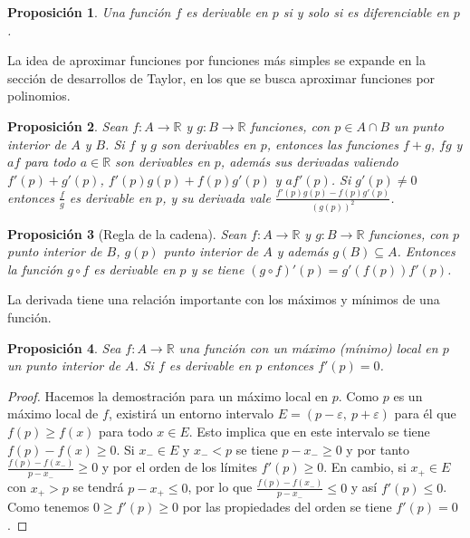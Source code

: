 \documentclass{article}
\newtheorem{prop}{Proposición}
\newcommand{\reales}{\mathbb{R}}
\begin{document}
\begin{prop}
	Una función $f$ es derivable en $p$ si y solo si es diferenciable en $p$.
\end{prop}

La idea de aproximar funciones por funciones más simples se expande en la sección de desarrollos de Taylor, en los que se busca aproximar funciones por polinomios.

\begin{prop}
	Sean $f: A \rightarrow \reales$ y $g: B \rightarrow \reales$ funciones, con $p \in A \cap B$ un punto interior de $A$ y $B$. Si $f$ y $g$ son derivables en $p$, entonces las funciones $f + g$, $fg$ y $af$ para todo $a \in \reales$ son derivables en $p$, además sus derivadas valiendo $f'(p) + g'(p)$, $f'(p)g(p) + f(p)g'(p)$ y $af'(p)$. Si $g'(p) \neq 0$ entonces $\frac{f}{g}$ es derivable en $p$, y su derivada vale $\frac{f'(p)g(p) - f(p)g'(p)}{(g(p))^2}$.
\end{prop}

\begin{prop}[Regla de la cadena]
	Sean $f: A \rightarrow \reales$ y $g: B \rightarrow \reales$ funciones, con $p$ punto interior de $B$, $g(p)$ punto interior de $A$ y además $g(B) \subseteq A$. Entonces la función $g \circ f$ es derivable en $p$ y se tiene $(g \circ f)'(p) = g'(f(p))f'(p)$.
\end{prop} 

La derivada tiene una relación importante con los máximos y mínimos de una función.

\begin{prop}
	Sea $f: A \rightarrow \reales$ una función con un máximo (mínimo) local en $p$ un punto interior de $A$. Si $f$ es derivable en $p$ entonces $f'(p) = 0$.
\end{prop}
\begin{proof}
	Hacemos la demostración para un máximo local en $p$. Como $p$ es un máximo local de $f$, existirá un entorno intervalo $E=(p-\varepsilon,\ p+\varepsilon)$ para él que $f(p) \geq f(x)$ para todo $x \in E$. Esto implica que en este intervalo se tiene $f(p) - f(x) \geq 0$. Si $x_{-} \in E$ y $x_{-} < p$ se tiene $p - x_{-} \geq 0$ y por tanto $\frac{f(p) - f(x_{-})}{p - x_{-}} \geq 0$ y por el orden de los límites $f'(p) \geq 0$. En cambio, si $x_{+} \in E$ con $x_{+} > p$ se tendrá $p - x_{+} \leq 0$, por lo que $\frac{f(p) - f(x_{-})}{p - x_{-}} \leq 0$ y así $f'(p) \leq 0$. Como tenemos $0 \geq f'(p) \geq 0$ por las propiedades del orden se tiene $f'(p) = 0$.
\end{proof}
\end{document}
